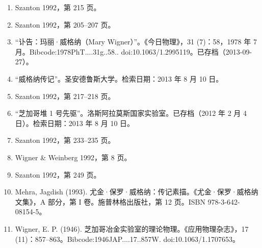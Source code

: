 \begin{enumerate}
\item Szanton 1992，第 215 页。
\item Szanton 1992，第 205–207 页。
\item “讣告：玛丽·威格纳（Mary Wigner）”。《今日物理》，31 (7)：58，1978 年 7 月。Bibcode:1978PhT....31g..58.. doi:10.1063/1.2995119。已存档（2013-09-27）。
\item “威格纳传记”。圣安德鲁斯大学。检索日期：2013 年 8 月 10 日。
\item Szanton 1992，第 217–218 页。
\item “芝加哥堆 1 号先驱”。洛斯阿拉莫斯国家实验室。已存档（2012 年 2 月 4 日）。检索日期：2013 年 8 月 10 日。
\item Szanton 1992，第 233–235 页。
\item Wigner & Weinberg 1992，第 8 页。
\item Szanton 1992，第 249 页。
\item Mehra, Jagdish (1993). 尤金·保罗·威格纳：传记素描。《尤金·保罗·威格纳文集》，A 部分，第 I 卷。施普林格出版社，第 12 页。ISBN 978-3-642-08154-5。
\item Wigner, E. P. (1946). 芝加哥冶金实验室的理论物理。《应用物理杂志》，17 (11)：857–863。Bibcode:1946JAP....17..857W. doi:10.1063/1.1707653。

\end{enumerate}